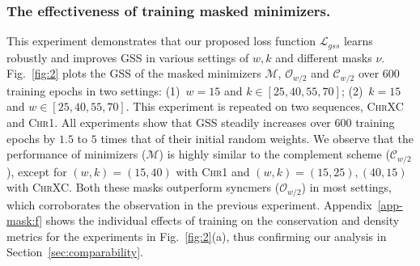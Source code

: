 \subsubsection{The effectiveness of training masked minimizers.} This experiment demonstrates that our proposed loss function $\mathcal{L}_{gss}$ learns robustly and improves GSS in various settings of $w, k$ and different masks $\nu$. Fig.~\ref{fig:2} plots the GSS of the masked minimizers $\mathcal{M}$, $\mathcal{O}_{w/2}$ and $\mathcal{C}_{w/2}$ over $600$ training epochs in two settings: (1)~$w=15$ and $k \in [25, 40, 55, 70]$; (2)~$k=15$ and $w \in [25, 40, 55, 70]$. This experiment is repeated on two sequences, \textsc{ChrXC} and \textsc{Chr1}. All experiments show that GSS steadily increases over $600$ training epochs by $1.5$ to $5$ times that of their initial random weights. We observe that the performance of minimizers ($\mathcal{M}$) is highly similar to the complement scheme ($\mathcal{C}_{w/2}$), except for $(w,k)=(15,40)$ with \textsc{Chr1} and $(w,k)=(15,25), (40, 15)$ with \textsc{ChrXC}. Both these masks outperform syncmers ($\mathcal{O}_{w/2}$) in most settings, which corroborates the observation in the previous experiment. Appendix~\ref{app-mask:f} shows the individual effects of training on the conservation and density metrics for the experiments in Fig.~\ref{fig:2}(a), thus confirming our analysis in Section~\ref{sec:comparability}.

